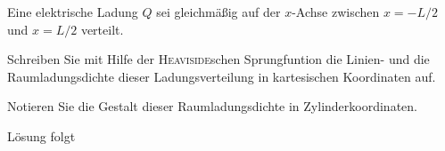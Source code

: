 \documentclass{atistandalonetask}
\begin{document}
  \begin{atiTask}[
    title = Die \textsc{Heaviside}sche Sprungfunktion
  ]
  
  Eine elektrische Ladung $Q$ sei gleichmäßig auf der $x$-Achse zwischen $x=-L/2$ und $x=L/2$ verteilt.
    \begin{atiSubtasks}
    	\item Schreiben Sie mit Hilfe der \textsc{Heaviside}schen Sprungfuntion die Linien- und die Raumladungsdichte dieser Ladungsverteilung in kartesischen Koordinaten auf.
    	\item Notieren Sie die Gestalt dieser Raumladungsdichte in Zylinderkoordinaten.
    \end{atiSubtasks}	
  \end{atiTask}
  \begin{atiSolution}
   	Lösung folgt
  \end{atiSolution}
\end{document}
